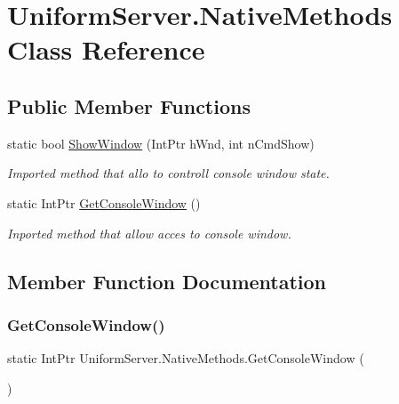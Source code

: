 \hypertarget{class_uniform_server_1_1_native_methods}{}\section{Uniform\+Server.\+Native\+Methods Class Reference}
\label{class_uniform_server_1_1_native_methods}
\subsection*{Public Member Functions}
\begin{DoxyCompactItemize}
\item 
static bool \mbox{\hyperlink{class_uniform_server_1_1_native_methods_aff29bbaf540e0aebe51ba9fd53576a86}{Show\+Window}} (Int\+Ptr h\+Wnd, int n\+Cmd\+Show)
\begin{DoxyCompactList}\small\item\em Imported method that allo to controll console window state. \end{DoxyCompactList}\item 
static Int\+Ptr \mbox{\hyperlink{class_uniform_server_1_1_native_methods_afe32a1810d024798a409e904c15d1a20}{Get\+Console\+Window}} ()
\begin{DoxyCompactList}\small\item\em Inported method that allow acces to console window. \end{DoxyCompactList}\end{DoxyCompactItemize}


\subsection{Member Function Documentation}
\mbox{\label{class_uniform_server_1_1_native_methods_afe32a1810d024798a409e904c15d1a20}} 
\subsubsection{\texorpdfstring{Get\+Console\+Window()}{GetConsoleWindow()}}
{\footnotesize\ttfamily static Int\+Ptr Uniform\+Server.\+Native\+Methods.\+Get\+Console\+Window (\begin{DoxyParamCaption}{ }\end{DoxyParamCaption})}



